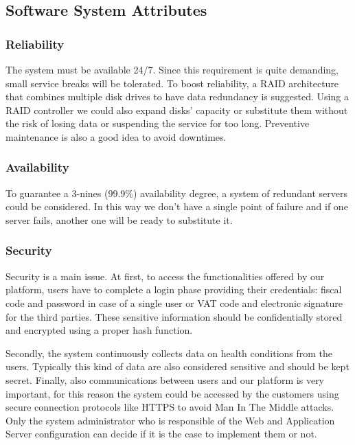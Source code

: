 \subsection{Software System Attributes}
\subsubsection{Reliability}

The system must be available 24/7. Since this requirement is quite demanding, small service breaks will be tolerated. To boost reliability, a RAID architecture that combines multiple disk drives to have data redundancy is suggested. Using a RAID controller we could also expand disks' capacity or substitute them without the risk of losing data or suspending the service for too long. Preventive maintenance is also a good idea to avoid downtimes.

\subsubsection{Availability}

To guarantee a 3-nines (99.9\%) availability degree, a system of redundant servers could be considered. In this way we don't have a single point of failure and if one server fails, another one will be ready to substitute it.

\subsubsection{Security}

Security is a main issue.  At first, to access the functionalities offered by our platform, users have to complete a login phase providing their credentials: fiscal code and password in case of a single user or VAT code and electronic signature for the third parties. These sensitive information should be confidentially stored and encrypted using a proper hash function.

Secondly, the system  continuously collects data on health conditions from the users. Typically this kind of data are also considered sensitive and should be kept secret. Finally, also communications between users and our platform is very important, for this reason the system could be accessed by the customers using secure connection protocols like HTTPS to avoid Man In The Middle attacks. Only the system administrator who is responsible of the Web and Application Server configuration can decide if it is the case to implement them or not.

